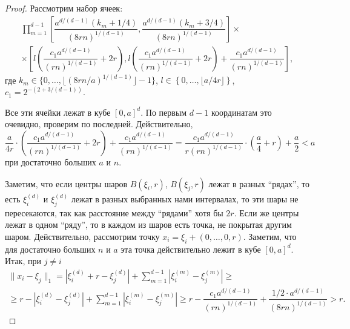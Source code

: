 \documentclass[12pt]{article}
\theoremstyle{plain}
\theoremstyle{definition}
\theoremstyle{remark}
\def\geq{\geqslant}
\begin{document}
\begin{proof}
    Рассмотрим набор ячеек: 
    \begin{multline*}
        \prod\limits_{m=1}^{d-1}\left[\dfrac{a^{d/(d-1)}(k_m+1/4)}{(8rn)^{1/(d-1)}}, \dfrac{a^{d/(d-1)}(k_m+3/4)}{(8rn)^{1/(d-1)}}\right]
    \times \\
    \times \left[l\left(\dfrac{c_1a^{d/(d-1)}}{(rn)^{1/(d-1)}} +2r\right) ,  l\left(\dfrac{c_1a^{d/(d-1)}}{(rn)^{1/(d-1)}}+2r\right) + \dfrac{c_1a^{d/(d-1)}}{(rn)^{1/(d-1)}}  \right],
    \end{multline*}{}
    где $k_m \in \{0, \ldots, \lfloor (8rn/a)^{1/(d-1)}\rfloor-1\}$, $l\in \left\{0, \ldots, \lfloor a/4r\rfloor\right\}$, $c_1 = 2^{-(2+3/(d-1))}$. 
    
    Все эти ячейки лежат в кубе $[0,a]^d$. По первым $d-1$ координатам это очевидно, проверим по последней. Действительно, 
    \begin{equation*}
        \dfrac{a}{4r}\cdot\left(\dfrac{c_1a^{d/(d-1)}}{(rn)^{1/(d-1)}}+2r\right) + \dfrac{c_1a^{d/(d-1)}}{(rn)^{1/(d-1)}} %
        = \dfrac{c_1a^{d/(d-1)}}{r(rn)^{1/(d-1)}}\cdot\left(\dfrac{a}{4} + r\right) + \dfrac{a}{2}
        < a
    \end{equation*}{}
    при достаточно больших $a$ и $n$.
    
    Заметим, что если центры шаров $B(\xi_i, r)$, $B(\xi_j, r)$ лежат в разных ``рядах'', то есть $\xi_i^{(d)}$ и $\xi_j^{(d)}$ лежат в разных выбранных нами интервалах, то эти шары не пересекаются, так как расстояние между ``рядами'' хотя бы $2r$. Если же центры лежат в одном ``ряду'', то в каждом из шаров есть точка, не покрытая другим шаром. Действительно, рассмотрим точку  $x_i = \xi_i + (0, \ldots, 0, r)$. Заметим, что для достаточно больших $n$ и $a$ эта точка действительно лежит в кубе $[0, a]^d$. Итак, при $j \not= i$
    \begin{multline*}
        \|x_i - \xi_j\|_1 = 
        |\xi_i^{(d)} + r - \xi_j^{(d)} | + \sum_{m=1}^{d-1}|\xi_i^{(m)} - \xi_j^{(m)}| \geq\\
        \geq r - |\xi_i^{(d)} - \xi_j^{(d)} | + \sum_{m=1}^{d-1}|\xi_i^{(m)} - \xi_j^{(m)}| \geq
        r - \dfrac{c_1a^{d/(d-1)}}{(rn)^{1/(d-1)}} + \dfrac{1/2\cdot a^{d/(d-1)}}{(8rn)^{1/(d-1)}} > r.
    \end{multline*}{}
    

\end{proof}
\end{document}
